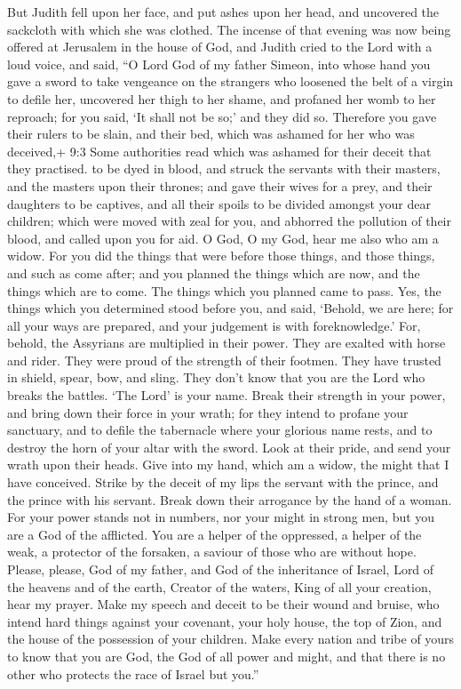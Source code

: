  But Judith fell upon her face, and put ashes upon her head,
and uncovered the sackcloth with which she was clothed. The incense of
that evening was now being offered at Jerusalem in the house of God, and
Judith cried to the Lord with a loud voice, and said,  ``O
Lord God of my father Simeon, into whose hand you gave a sword to take
vengeance on the strangers who loosened the belt of a virgin to defile
her, uncovered her thigh to her shame, and profaned her womb to her
reproach; for you said, `It shall not be so;' and they did so.
 Therefore you gave their rulers to be slain, and their bed,
which was ashamed for her who was deceived,+ 9:3 Some authorities read
which was ashamed for their deceit that they practised. to be dyed in
blood, and struck the servants with their masters, and the masters upon
their thrones;  and gave their wives for a prey, and their
daughters to be captives, and all their spoils to be divided amongst
your dear children; which were moved with zeal for you, and abhorred the
pollution of their blood, and called upon you for aid. O God, O my God,
hear me also who am a widow.  For you did the things that
were before those things, and those things, and such as come after; and
you planned the things which are now, and the things which are to come.
The things which you planned came to pass.  Yes, the things
which you determined stood before you, and said, `Behold, we are here;
for all your ways are prepared, and your judgement is with
foreknowledge.'  For, behold, the Assyrians are multiplied
in their power. They are exalted with horse and rider. They were proud
of the strength of their footmen. They have trusted in shield, spear,
bow, and sling. They don't know that you are the Lord who breaks the
battles. `The Lord' is your name.  Break their strength in
your power, and bring down their force in your wrath; for they intend to
profane your sanctuary, and to defile the tabernacle where your glorious
name rests, and to destroy the horn of your altar with the sword.
 Look at their pride, and send your wrath upon their heads.
Give into my hand, which am a widow, the might that I have conceived.
 Strike by the deceit of my lips the servant with the
prince, and the prince with his servant. Break down their arrogance by
the hand of a woman.  For your power stands not in numbers,
nor your might in strong men, but you are a God of the afflicted. You
are a helper of the oppressed, a helper of the weak, a protector of the
forsaken, a saviour of those who are without hope.  Please,
please, God of my father, and God of the inheritance of Israel, Lord of
the heavens and of the earth, Creator of the waters, King of all your
creation, hear my prayer.  Make my speech and deceit to be
their wound and bruise, who intend hard things against your covenant,
your holy house, the top of Zion, and the house of the possession of
your children.  Make every nation and tribe of yours to
know that you are God, the God of all power and might, and that there is
no other who protects the race of Israel but you.''

